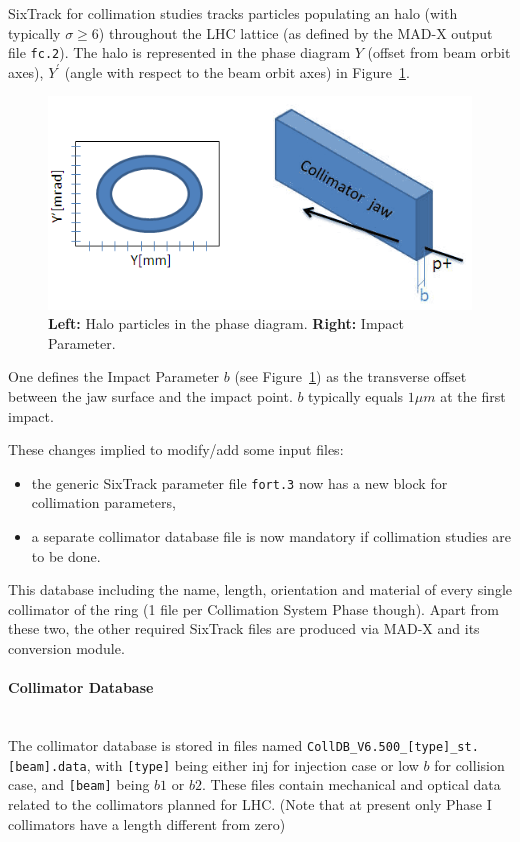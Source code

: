 SixTrack for collimation studies tracks particles populating an halo (with typically $\sigma \geq 6$) throughout the LHC lattice (as defined by the MAD-X output file \texttt{fc.2}).
The halo is represented in the phase diagram $Y$ (offset from beam orbit axes), $Y^\prime$ (angle with respect to the beam orbit axes) in Figure~\ref{Coll:Fig1}.
\begin{figure}[H]
\begin{center}
    \includegraphics[width=0.5\linewidth]{figures/coll_fig1}
    \caption{\label{Coll:Fig1} \textbf{Left:} Halo particles in the phase diagram. \textbf{Right:} Impact Parameter.}
\end{center}
\end{figure}

One defines the Impact Parameter $b$ (see Figure~\ref{Coll:Fig1}) as the transverse offset between the jaw surface and the impact point.
$b$ typically equals $1\mu m$ at the first impact.

\bigskip
\noindent These changes implied to modify/add some input files:
\begin{itemize}
    \item the generic SixTrack parameter file \texttt{fort.3} now has a new block for collimation parameters,
    \item a separate collimator database file is now mandatory if collimation studies are to be done.
\end{itemize}

This database including the name, length, orientation and material of every single collimator of the ring (1 file per Collimation System Phase though).
Apart from these two, the other required SixTrack files are produced via MAD-X and its conversion module.

\paragraph{Collimator Database}~\\

The collimator database is stored in files named \texttt{CollDB\_V6.500\_[type]\_st.[beam].data}, with \texttt{[type]} being either inj for injection case or low $b$ for collision case, and \texttt{[beam]} being $b1$ or $b2$.
These files contain mechanical and optical data related to the collimators planned for LHC. (Note that at present only Phase I collimators have a length different from zero)


